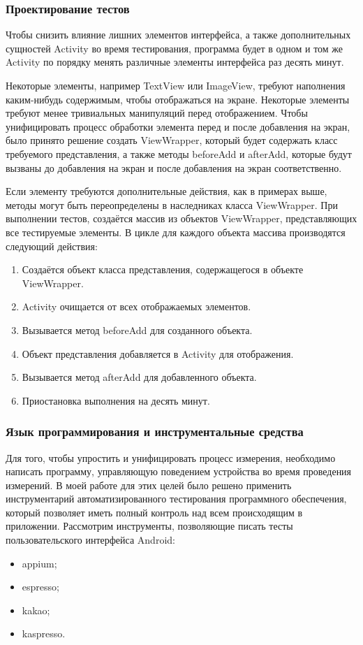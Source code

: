 \documentclass[a4paper,14pt]{extarticle} %
\begin{document}
	\subsubsection{Проектирование тестов}
	
	Чтобы снизить влияние лишних элементов интерфейса, а также дополнительных сущностей Activity во время тестирования, программа будет в одном и том же Activity по порядку менять различные элементы интерфейса раз десять минут.
	
	Некоторые элементы, например TextView или ImageView, требуют наполнения каким-нибудь содержимым, чтобы отображаться на экране. Некоторые элементы требуют менее тривиальных манипуляций перед отображением. Чтобы унифицировать процесс обработки элемента перед и после добавления на экран, было принято решение создать ViewWrapper, который будет содержать класс требуемого представления, а также методы beforeAdd и afterAdd, которые будут вызваны до добавления на экран и после добавления на экран соответственно. 
	
	Если элементу требуются дополнительные действия, как в примерах выше, методы могут быть переопределены в наследниках класса ViewWrapper. При выполнении тестов, создаётся массив из объектов ViewWrapper, представляющих все тестируемые элементы. В цикле для каждого объекта массива производятся следующий действия:
	\begin{enumerate}
		\item Создаётся объект класса представления, содержащегося в объекте ViewWrapper.
		\item Activity очищается от всех отображаемых элементов.
		\item Вызывается метод beforeAdd для созданного объекта.
		\item Объект представления добавляется в Activity для отображения.
		\item Вызывается метод afterAdd для добавленного объекта.
		\item Приостановка выполнения на десять минут.
	\end{enumerate}
	
	\subsubsection{Язык программирования и  инструментальные средства}
	
	Для того, чтобы упростить и унифицировать процесс измерения, необходимо написать программу, управляющую поведением устройства во время проведения измерений. В моей работе для этих целей было решено применить инструментарий автоматизированного тестирования программного обеспечения, который позволяет иметь полный контроль над всем происходящим в приложении. Рассмотрим инструменты, позволяющие писать тесты пользовательского интерфейса Android:
	\begin{itemize}
		\item appium;
		\item espresso;
		\item kakao;
		\item kaspresso.
	\end{itemize}
	
\end{document}
